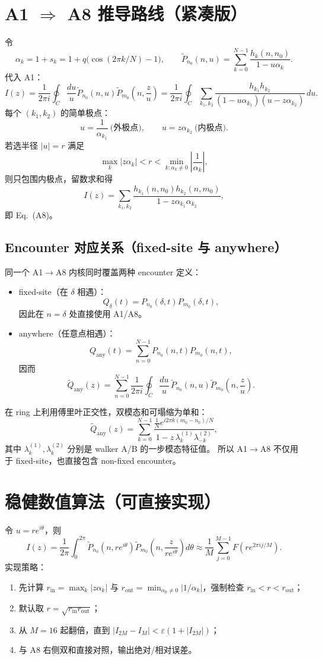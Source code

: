 \documentclass[11pt]{article}
\begin{document}
\section{A1 \texorpdfstring{$\Rightarrow$}{=>} A8 推导路线（紧凑版）}
令
\[
\alpha_k=1+s_k=1+q\bigl(\cos(2\pi k/N)-1\bigr),\qquad
\widetilde P_{n_0}(n,u)=\sum_{k=0}^{N-1}\frac{h_k(n,n_0)}{1-u\alpha_k}.
\]
代入 A1：
\[
I(z)=\frac{1}{2\pi i}\oint_C\frac{du}{u}\widetilde P_{n_0}(n,u)\widetilde P_{m_0}\!\left(n,\frac{z}{u}\right)
=\frac{1}{2\pi i}\oint_C\sum_{k_1,k_2}
\frac{h_{k_1}h_{k_2}}{(1-u\alpha_{k_1})(u-z\alpha_{k_2})}\,du.
\]
每个 $(k_1,k_2)$ 的简单极点：
\[
u=\frac1{\alpha_{k_1}}\ \text{(外极点)},\qquad u=z\alpha_{k_2}\ \text{(内极点)}.
\]
若选半径 $|u|=r$ 满足
\[
\max_k|z\alpha_k|<r<\min_{k:\alpha_k\ne0}\left|\frac1{\alpha_k}\right|,
\]
则只包围内极点，留数求和得
\[
I(z)=\sum_{k_1,k_2}
\frac{h_{k_1}(n,n_0)h_{k_2}(n,m_0)}{1-z\alpha_{k_1}\alpha_{k_2}},
\]
即 Eq.~(A8)。

\subsection*{Encounter 对应关系（fixed-site 与 anywhere）}
同一个 A1$\to$A8 内核同时覆盖两种 encounter 定义：
\begin{itemize}[leftmargin=1.4em]
  \item fixed-site（在 $\delta$ 相遇）：
  \[
  Q_{\delta}(t)=P_{n_0}(\delta,t)P_{m_0}(\delta,t),
  \]
  因此在 $n=\delta$ 处直接使用 A1/A8。
  \item anywhere（任意点相遇）：
  \[
  Q_{\mathrm{any}}(t)=\sum_{n=0}^{N-1}P_{n_0}(n,t)P_{m_0}(n,t),
  \]
  因而
  \[
  \widetilde Q_{\mathrm{any}}(z)=\sum_{n=0}^{N-1}\frac{1}{2\pi i}\oint_C \frac{du}{u}\,
  \widetilde P_{n_0}(n,u)\widetilde P_{m_0}\!\left(n,\frac{z}{u}\right).
  \]
\end{itemize}
在 ring 上利用傅里叶正交性，双模态和可塌缩为单和：
\[
\widetilde Q_{\mathrm{any}}(z)=
\sum_{k=0}^{N-1}
\frac{\frac{1}{N}e^{i2\pi k(m_0-n_0)/N}}
{1-z\,\lambda_k^{(1)}\lambda_{-k}^{(2)}},
\]
其中 $\lambda_k^{(1)},\lambda_k^{(2)}$ 分别是 walker A/B 的一步模态特征值。
所以 A1$\to$A8 不仅用于 fixed-site，也直接包含 non-fixed encounter。

\section{稳健数值算法（可直接实现）}
令 $u=re^{i\theta}$，则
\[
I(z)=\frac1{2\pi}\int_0^{2\pi}
\widetilde P_{n_0}(n,re^{i\theta})
\widetilde P_{m_0}\!\left(n,\frac{z}{re^{i\theta}}\right)d\theta
\approx \frac1M\sum_{j=0}^{M-1}F\!\left(re^{2\pi ij/M}\right).
\]
实现策略：
\begin{enumerate}[leftmargin=1.4em]
  \item 先计算 $r_{\mathrm{in}}=\max_k|z\alpha_k|$ 与 $r_{\mathrm{out}}=\min_{\alpha_k\ne0}|1/\alpha_k|$，强制检查 $r_{\mathrm{in}}<r<r_{\mathrm{out}}$；
  \item 默认取 $r=\sqrt{r_{\mathrm{in}}r_{\mathrm{out}}}$；
  \item 从 $M=16$ 起翻倍，直到 $|I_{2M}-I_M|<\varepsilon(1+|I_{2M}|)$；
  \item 与 A8 右侧双和直接对照，输出绝对/相对误差。
\end{enumerate}
\end{document}
